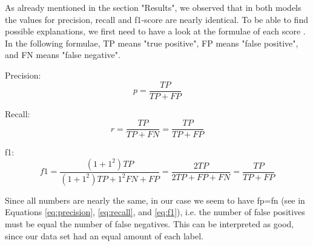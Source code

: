 \documentclass[sigconf,screen]{acmart}
\begin{document}
As already mentioned in the section "Results", we observed that in both models the values for precision, recall and f1-score are nearly identical. To be able to find possible explanations, we first need to have a look at the formulae of each score \cite{scoreExplanation}. In the following formulae, TP means "true positive", FP means "false positive", and FN means "false negative".

Precision:
\begin{equation}
	p = \frac{TP}{TP+FP}
	\label{eq:precision}
\end{equation}

Recall:
\begin{equation}
	r = \frac{TP}{TP+FN} = \frac{TP}{TP+FP}
	\label{eq:recall}
\end{equation}

f1:
\begin{equation}
	f1 = \frac{(1+1^2)TP}{(1+1^2)TP +1^2 FN+FP} = \frac{2TP}{2TP+FP+FN} = \frac{TP}{TP+FP}
	\label{eq:f1}
\end{equation}

Since all numbers are nearly the same, in our case we seem to have fp=fn (see in Equations \ref{eq:precision}, \ref{eq:recall}, and \ref{eq:f1}), i.e. the number of false positives must be equal the number of false negatives. This can be interpreted as good, since our data set had an equal amount of each label.





\appendix
\end{document}
